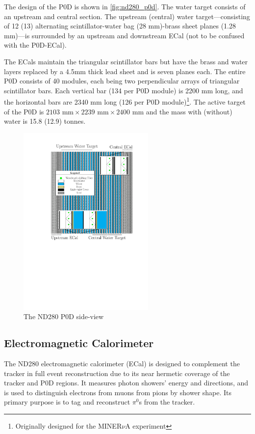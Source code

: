 The design of the P0D is shown in \autoref{fig:nd280_p0d}. The water target consists of an upstream and central section. The upstream (central) water target---consisting of 12 (13) alternating scintillator-water bag (28 mm)-brass sheet planes (1.28 mm)---is surrounded by an upstream and downstream ECal (not to be confused with the P0D-ECal).

The ECals maintain the triangular scintillator bars but have the brass and water layers replaced by a 4.5mm thick lead sheet and is seven planes each. The entire P0D consists of 40 modules, each being two perpendicular arrays of triangular scintillator bars. Each vertical bar (134 per P0D module) is 2200 mm long, and the horizontal bars are 2340 mm long (126 per P0D module)\footnote{Originally designed for the MINER$\nu$A experiment\cite{minerva_design}}. The active target of the P0D is $2103\text{ mm}\times2239\text{ mm}\times2400\text{ mm}$ and the mass with (without) water is 15.8 (12.9) tonnes.
\begin{figure}[h]
	\includegraphics[width=0.6\textwidth, trim={0mm 110mm 0mm 0mm}, clip,page=1]{figures/det_chap/p0d/p0d.pdf}
	\caption{The ND280 P0D side-view}
	\label{fig:nd280_p0d}
\end{figure}

\subsection{Electromagnetic Calorimeter}
The ND280 electromagnetic calorimeter (ECal)\cite{t2k_ecal} is designed to complement the tracker in full event reconstruction due to its near hermetic coverage of the tracker and P0D regions. It measures photon showers' energy and directions, and is used to distinguish electrons from muons from pions by shower shape. Its primary purpose is to tag and reconstruct $\pi^0$s from the tracker.

